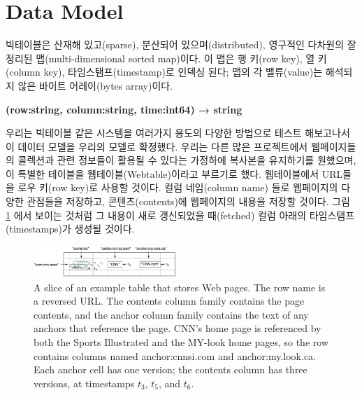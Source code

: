 \documentclass[twocolumn]{article}
\begin{document}
\section{Data Model}
빅테이블은 산재해 있고(sparse), 분산되어 있으며(distributed), 영구적인 다차원의 잘 정리된 맵(multi-dimensional sorted map)이다. 이 맵은 행 키(row key), 열 키(column key), 타임스탬프(timestamp)로 인덱싱 된다; 맵의 각 밸류(value)는 해석되지 않은 바이트 어레이(bytes array)이다.

{\small \bf
(row:string, column:string, time:int64) → string
}

우리는 빅테이블 같은 시스템을 여러가지 용도의 다양한 방법으로 테스트 해보고나서 이 데이터 모델을 우리의 모델로 확정했다. 우리는 다른 많은 프로젝트에서 웹페이지들의 콜렉션과 관련 정보들이 활용될 수 있다는 가정하에 복사본을 유지하기를 원했으며, 이 특별한 테이블을 웹테이블(Webtable)이라고 부르기로 했다. 웹테이블에서 URL들을 로우 키(row key)로 사용할 것이다. 컬럼 네임(column name) 들로 웹페이지의 다양한 관점들을 저장하고, 콘텐츠(contents)에 웹페이지의 내용을 저장할 것이다. 그림 \ref{fig01} 에서 보이는 것처럼 그 내용이 새로 갱신되었을 때(fetched) 컬럼 아래의 타임스탬프(timestamps)가 생성될 것이다.

\begin{figure}[htb]
        \centering
        \includegraphics[width=0.48\textwidth]{figure01}
        \caption{\small A slice of an example table that stores Web pages. The row name is a reversed URL. The contents column family contains the page contents, and the anchor column family contains the text of any anchors that reference the page. CNN’s home page is referenced by both the Sports Illustrated and the MY-look home pages, so the row contains columns named anchor:cnnsi.com and anchor:my.look.ca. Each anchor cell has one version; the contents column has three versions, at timestamps $t_3$, $t_5$, and $t_6$.}
        \label{fig01}
\end{figure}

 
\end{document}
